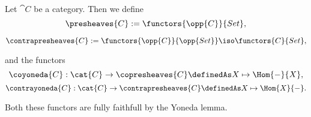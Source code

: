 \begin{definition}
Let $\cat{C}$ be a category. Then we define
\[\presheaves{C} := \functors{\opp{C}}{Set},\]

\[\contrapresheaves{C} := \functors{\opp{C}}{\opp{Set}} \iso \functors{C}{Set},\]

and the functors 
\[\coyoneda{C} : \cat{C} \rightarrow \copresheaves{C} \definedAs X \mapsto \Hom{-}{X},\]
\[\contrayoneda{C} : \cat{C} \rightarrow \contrapresheaves{C} \definedAs  X \mapsto \Hom{X}{-}.\]

Both these functors are fully faithfull by the Yoneda lemma.
\end{definition}